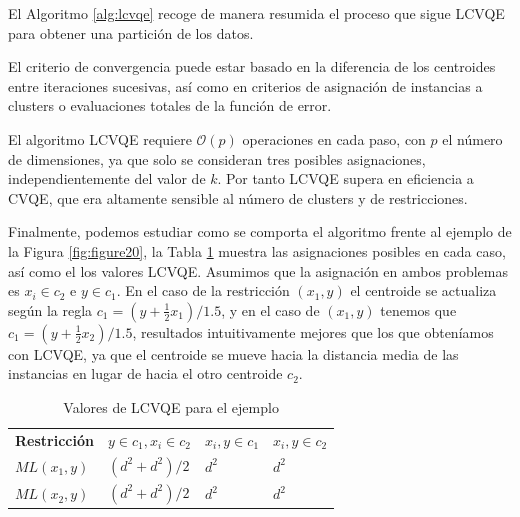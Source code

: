 El Algoritmo \ref{alg:lcvqe} recoge de manera resumida el proceso que sigue \acs{LCVQE} para obtener una partición de los datos. 

El criterio de convergencia puede estar basado en la diferencia de los centroides entre iteraciones sucesivas, así como en criterios de asignación de instancias a clusters o evaluaciones totales de la función de error.

El algoritmo \acs{LCVQE} requiere $\mathcal{O}(p)$ operaciones en cada paso, con $p$ el número de dimensiones, ya que solo se consideran tres posibles asignaciones, independientemente del valor de $k$. Por tanto \acs{LCVQE} supera en eficiencia a \acs{CVQE}, que era altamente sensible al número de clusters y de restricciones.

Finalmente, podemos estudiar como se comporta el algoritmo frente al ejemplo de la Figura \ref{fig:figure20}, la Tabla \ref{tab:tabla4} muestra las asignaciones posibles en cada caso, así como el los valores \acs{LCVQE}. Asumimos que la asignación en ambos problemas es $x_i \in c_2$ e $y \in c_1$. En el caso de la restricción $(x_1, y)$ el centroide se actualiza según la regla $c_1 = (y + \frac{1}{2}x_1)/1.5$, y en el caso de $(x_1, y)$ tenemos que $c_1 = (y + \frac{1}{2}x_2)/1.5$, resultados intuitivamente mejores que los que obteníamos con \acs{LCVQE}, ya que el centroide se mueve hacia la distancia media de las instancias en lugar de hacia el otro centroide $c_2$.

\begin{table}[!h]
	\centering
	\setlength{\arrayrulewidth}{1mm}
	\setlength{\tabcolsep}{10pt}
	\renewcommand{\arraystretch}{1}
	
	\begin{tabular}{ >{\centering\arraybackslash}m{2cm}  >{\centering\arraybackslash}m{2.5cm}>{\centering\arraybackslash}m{2cm}>{\centering\arraybackslash}m{2cm}}
		\hline
		\rowcolor{black}
		\multicolumn{4}{c}{\bf \color{white}{Valores de LCVQE}}\\
		\hline
		\rowcolor{gray!50}
		\textbf{Restricción} & \textbf{$y \in c_1, x_i \in c_2$} & \textbf{$x_i,y \in c_1$} & \textbf{$x_i,y \in c_2$}  \\
		$ML(x_1, y)$ & $(d^2 + d^2)/2$ & $d^2$ & $d^2$  \\
		$ML(x_2, y)$  & $(d^2 + d^2)/2$ & $d^2$ & $d^2$ \\
		\hline
		
	\end{tabular}
	\caption[Valores de LCVQE para el ejemplo]{Valores de LCVQE para el ejemplo \cite{CECM:2012}}
	\label{tab:tabla4}
\end{table}

